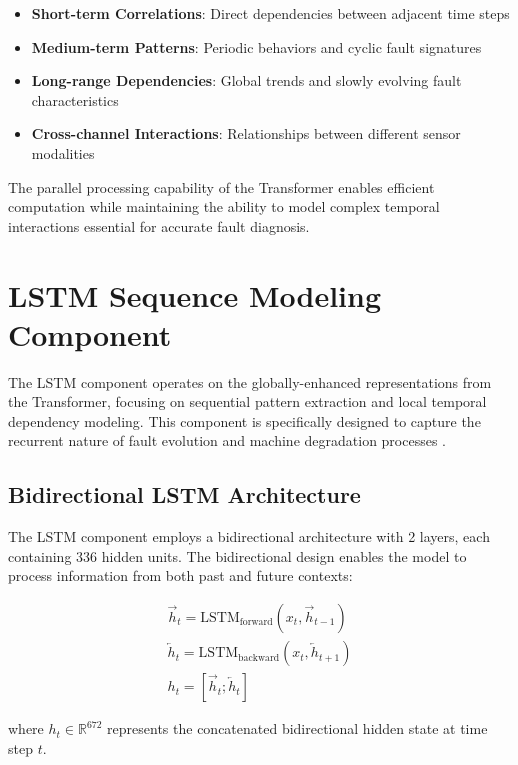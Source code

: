 \begin{itemize}
    \item \textbf{Short-term Correlations}: Direct dependencies between adjacent time steps
    \item \textbf{Medium-term Patterns}: Periodic behaviors and cyclic fault signatures  
    \item \textbf{Long-range Dependencies}: Global trends and slowly evolving fault characteristics
    \item \textbf{Cross-channel Interactions}: Relationships between different sensor modalities
\end{itemize}

The parallel processing capability of the Transformer enables efficient computation while maintaining the ability to model complex temporal interactions essential for accurate fault diagnosis.

\section{LSTM Sequence Modeling Component}
\label{sec:hybrid_model:lstm_component}

The LSTM component operates on the globally-enhanced representations from the Transformer, focusing on sequential pattern extraction and local temporal dependency modeling. This component is specifically designed to capture the recurrent nature of fault evolution and machine degradation processes \citep{hochreiter1997long, filonov2016multivariateindustrialtimeseries}.

\subsection{Bidirectional LSTM Architecture}
\label{subsec:bilstm_architecture}

The LSTM component employs a bidirectional architecture with 2 layers, each containing 336 hidden units. The bidirectional design enables the model to process information from both past and future contexts:

\begin{align}
\overrightarrow{h}_t = \text{LSTM}_{\text{forward}}(x_t, \overrightarrow{h}_{t-1}) \\
\overleftarrow{h}_t = \text{LSTM}_{\text{backward}}(x_t, \overleftarrow{h}_{t+1}) \\
h_t = [\overrightarrow{h}_t; \overleftarrow{h}_t]
\end{align}

where $h_t \in \mathbb{R}^{672}$ represents the concatenated bidirectional hidden state at time step $t$.

